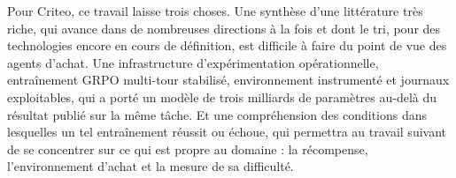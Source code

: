 \documentclass[11pt,a4paper]{article}
\begin{document}
Pour Criteo, ce travail laisse trois choses. Une synthèse d'une littérature très riche, qui avance dans de nombreuses directions à la fois et dont le tri, pour des technologies encore en cours de définition, est difficile à faire du point de vue des agents d'achat. Une infrastructure d'expérimentation opérationnelle, entraînement GRPO multi-tour stabilisé, environnement instrumenté et journaux exploitables, qui a porté un modèle de trois milliards de paramètres au-delà du résultat publié sur la même tâche. Et une compréhension des conditions dans lesquelles un tel entraînement réussit ou échoue, qui permettra au travail suivant de se concentrer sur ce qui est propre au domaine : la récompense, l'environnement d'achat et la mesure de sa difficulté.










\newpage



\newpage
\end{document}
